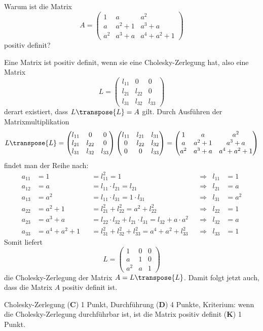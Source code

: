 Warum ist die Matrix
\[
A
=
\begin{pmatrix}
1&a&a^2\\
a&a^2+1&a^3+a\\
a^2&a^3+a&a^4+a^2+1
\end{pmatrix}
\]
positiv definit?


\begin{loesung}
Eine Matrix ist positiv definit, wenn sie eine Cholesky-Zerlegung hat,
also eine Matrix
\[
L
=
\begin{pmatrix}
l_{11}&0&0\\
l_{21}&l_{22}&0\\
l_{31}&l_{32}&l_{33}
\end{pmatrix}
\]
derart existiert, dass $L\transpose{L}=A$ gilt.
Durch Ausführen der Matrixmultiplikation
\[
L\transpose{L}
=
\begin{pmatrix}
l_{11}&0&0\\
l_{21}&l_{22}&0\\
l_{31}&l_{32}&l_{33}
\end{pmatrix}
\begin{pmatrix}
l_{11}&l_{21}&l_{31}\\
0&l_{22}&l_{32}\\
0&0&l_{33}
\end{pmatrix}
=
\begin{pmatrix}
1&a&a^2\\
a&a^2+1&a^3+a\\
a^2&a^3+a&a^4+a^2+1
\end{pmatrix}
\]
findet man der Reihe nach:
\begin{align*}
a_{11}&=1&
&=
l_{11}^2 =1
&&\Rightarrow&
l_{11}&=1\\
a_{12}&=a&
&=
l_{11}\cdot l_{21}
=
l_{21}
&&\Rightarrow&
l_{21}&=a\\
a_{13}&=a^2&
&=
l_{11}\cdot l_{31}=1\cdot l_{31}
&&\Rightarrow&
l_{31}&=a^2\\
a_{22}&=a^2+1&
&=
l_{21}^2 + l_{22}^2=a^2 + l_{22}^2
&&\Rightarrow&
l_{22}&=1\\
a_{23}&=a^3+a&
&=
l_{22}\cdot l_{32} + l_{21}\cdot l_{31} 
=
l_{32} + a\cdot a^2
&&\Rightarrow&
l_{32}&=a\\
a_{33}&=a^4+a^2+1&
&=
l_{31}^2 + l_{32}^2 + l_{33}^2=a^4+a^2+l_{33}^2
&&\Rightarrow&
l_{33}&=1
\end{align*}
Somit liefert
\[
L=\begin{pmatrix}
1&0&0\\
a&1&0\\
a^2&a&1
\end{pmatrix}
\]
die Cholesky-Zerlegung der Matrix $A=L\transpose{L}$.
Damit folgt jetzt auch, dass die Matrix $A$ positiv definit ist.
\end{loesung}

\begin{bewertung}
Cholesky-Zerlegung ({\bf C}) 1 Punkt,
Durchführung ({\bf D}) 4 Punkte,
Kriterium: wenn die Cholesky-Zerlegung durchführbar ist, ist die
Matrix positiv definit ({\bf K}) 1 Punkt.
\end{bewertung}
